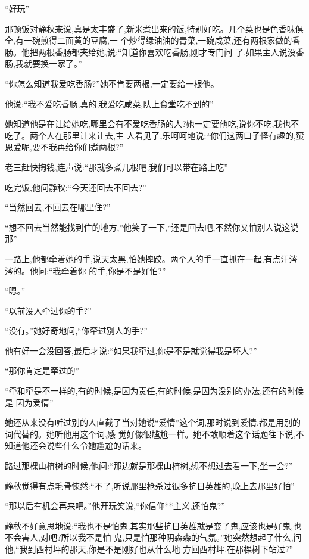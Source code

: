 ﻿\documentclass[12pt]{article}
\begin{document}
``好玩\myrule ''

那顿饭对静秋来说,真是太丰盛了,新米煮出来的饭,特别好吃。几个菜也是色香味俱全,有一碗煎得二面黄的豆腐,一
个炒得绿油油的青菜,一碗咸菜,还有两根家做的香肠。他把两根香肠都夹给她,说:``知道你喜欢吃香肠,刚才专门问
了,如果主人说没香肠,我就要换一家了。''

``你怎么知道我爱吃香肠?''她不肯要两根,一定要给一根他。

他说:``我不爱吃香肠,真的,我爱吃\myrule 咸菜,队上食堂吃不到的\myrule ''

她知道他是在让给她吃,哪里会有不爱吃香肠的人?她一定要他吃,说你不吃,我也不吃了。两个人在那里让来让去,主
人看见了,乐呵呵地说:``你们这两口子怪有趣的,蛮恩爱呢,要不我再给你们煮两根?''

老三赶快掏钱,连声说:``那就多煮几根吧,我们可以带在路上吃\myrule ''

吃完饭,他问静秋:``今天还回去不回去?''

``当然回去,不回去在哪里住?''

``想不回去当然能找到住的地方,''他笑了一下,``还是回去吧,不然你又怕别人说这说那\myrule ''

一路上,他都牵着她的手,说天太黑,怕她摔跤。两个人的手一直抓在一起,有点汗涔涔的。他问:``我\myrule 牵着你
的手,你是不是\myrule 好怕?''

``嗯。''

``以前没人牵过你的手?''

``没有。''她好奇地问,``你牵过别人的手?''

他有好一会没回答,最后才说:``如果我牵过,你是不是就觉得我是坏人?''

``那你肯定是牵过的\myrule ''

``牵和牵是不一样的,有的时候,是因为\myrule 责任,有的时候,是因为\myrule 没别的办法,还有的时候\myrule 是
因为\myrule 爱情\myrule ''

她还从来没有听过别的人直截了当对她说``爱情''这个词,那时说到爱情,都是用别的词代替的。她听他用这个词,感
觉好像很尴尬一样。她不敢顺着这个话题往下说,不知道他还会说些什么令她尴尬的话来。

路过那棵山楂树的时候,他问:``那边就是那棵山楂树,想不想过去看一下,坐一会?''

静秋觉得有点毛骨悚然:``不了,听说那里枪杀过很多抗日英雄的,晚上去那里好怕\myrule ''

``那以后有机会再来吧。''他开玩笑说,``你信仰**主义,还怕鬼?''

静秋不好意思地说:``我也不是怕鬼,其实那些抗日英雄就是变了鬼,应该也是好鬼,也不会害人,对吧?所以我不是怕
鬼,只是怕\myrule 那种阴森森的气氛。''她突然想起了什么,问他,``我到西村坪的那天,你是不是刚好也从什么地
方回西村坪,在那棵树下站过?''
\end{document}
